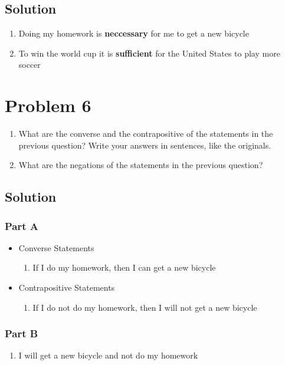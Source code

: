 \documentclass[12pt]{extarticle}
\begin{document}
\subsection*{Solution}

\begin{enumerate}[label=(\alph*)]
	\item Doing my homework is \textbf{neccessary} for me to get a new bicycle
	\item To win the world cup it is \textbf{sufficient} for the United States to play more soccer
\end{enumerate}

\section*{Problem 6}

\begin{enumerate}[label=(\alph*)]
	\item What are the converse and the contrapositive of the statements in the previous question? Write your answers in sentences, like the originals.
	\item What are the negations of the statements in the previous question? 
\end{enumerate}

\subsection*{Solution}

\subsubsection*{Part A}

\begin{itemize}
	\item Converse Statements
	\begin{enumerate}[label=(\alph*)]
		\item If I do my homework, then I can get a new bicycle
	\end{enumerate}
	\item Contrapositive Statements
	\begin{enumerate}[label=(\alph*)]
		\item If I do not do my homework, then I will not get a new bicycle 
	\end{enumerate}
\end{itemize}

\subsubsection*{Part B}
\begin{enumerate}[label=(\alph*)]
	\item I will get a new bicycle and not do my homework
\end{enumerate}
\end{document}
